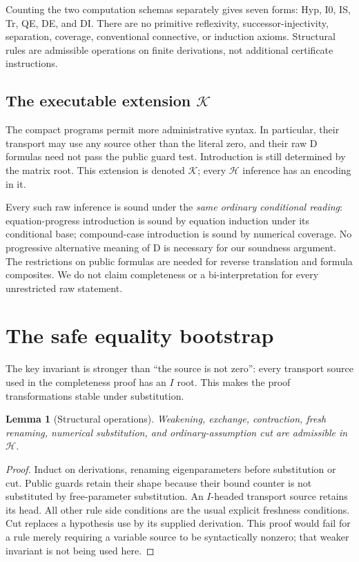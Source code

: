 \documentclass[11pt,letterpaper]{article}
\newtheorem{lemma}[theorem]{Lemma}
\theoremstyle{definition}\newtheorem{definition}[theorem]{Definition}
\theoremstyle{remark}\newtheorem{remark}[theorem]{Remark}
\newcommand{\Hcal}{\mathcal H}\newcommand{\Kcal}{\mathcal K}
\begin{document}
Counting the two computation schemas separately gives seven forms:
Hyp, I0, IS, Tr, QE, DE, and DI. There are no primitive reflexivity,
successor-injectivity, separation, coverage, conventional connective,
or induction axioms. Structural rules are admissible operations on
finite derivations, not additional certificate instructions.

\subsection{The executable extension \texorpdfstring{\(\Kcal\)}{K}}

The compact programs permit more administrative syntax. In particular,
their transport may use any source other than the literal zero, and
their raw D formulas need not pass the public guard test. Introduction
is still determined by the matrix root. This extension is denoted
\(\Kcal\); every \(\Hcal\) inference has an encoding in it.

Every such raw inference is sound under the \emph{same ordinary
conditional reading}: equation-progress introduction is sound by
equation induction under its conditional base; compound-case
introduction is sound by numerical coverage. No progressive alternative
meaning of D is necessary for our soundness argument. The restrictions
on public formulas are needed for reverse translation and formula
composites. We do not claim completeness or a bi-interpretation for
every unrestricted raw statement.

\section{The safe equality bootstrap}\label{sec:safe}

The key invariant is stronger than ``the source is not zero'': every
transport source used in the completeness proof has an \(I\) root.
This makes the proof transformations stable under substitution.

\begin{lemma}[Structural operations]\label{lem:struct}
Weakening, exchange, contraction, fresh renaming, numerical substitution,
and ordinary-assumption cut are admissible in \(\Hcal\).
\end{lemma}
\begin{proof}
Induct on derivations, renaming eigenparameters before substitution or
cut. Public guards retain their shape because their bound counter is
not substituted by free-parameter substitution. An \(I\)-headed
transport source retains its head. All other rule side conditions are
the usual explicit freshness conditions. Cut replaces a hypothesis use
by its supplied derivation. This proof would fail for a rule merely
requiring a variable source to be syntactically nonzero; that weaker
invariant is not being used here.
\end{proof}
\end{document}
